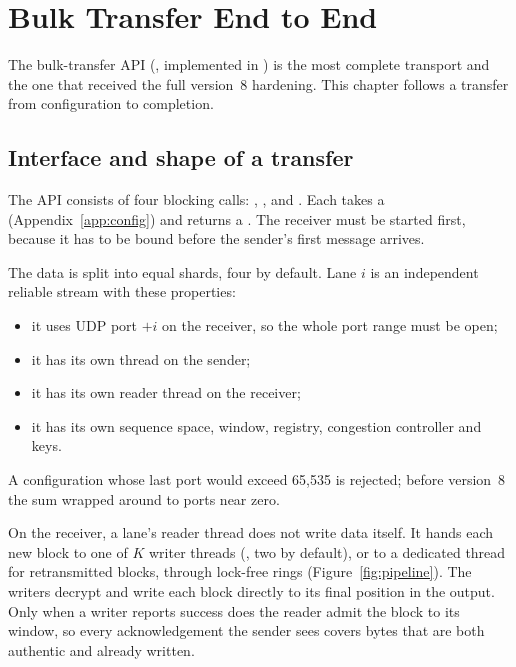 \chapter{Bulk Transfer End to End}\label{ch:transfer}

The bulk-transfer API (, implemented in ) is the most
complete transport and the one that received the full version~8 hardening. This chapter follows a transfer
from configuration to completion.

\section{Interface and shape of a transfer}

The API consists of four blocking calls: , ,  and
. Each takes a  (Appendix~\ref{app:config}) and returns a
. The receiver must be started first, because it has to be bound before the sender's
first message arrives.

The data is split into  equal shards, four by default. Lane $i$ is an independent reliable stream
with these properties:
\begin{itemize}
  \item it uses UDP port $+i$ on the receiver, so the whole port range must be open;
  \item it has its own thread on the sender;
  \item it has its own reader thread on the receiver;
  \item it has its own sequence space, window, registry, congestion controller and keys.
\end{itemize}
A configuration whose last port would exceed 65,535 is rejected\vviii; before version~8 the sum wrapped around
to ports near zero.

On the receiver, a lane's reader thread does not write data itself. It hands each new block to one of $K$ writer
threads (, two by default), or to a dedicated thread for retransmitted blocks, through
lock-free rings (Figure~\ref{fig:pipeline}). The writers decrypt and write each block directly to its final
position in the output. Only when a writer reports success does the reader admit the block to its window, so
every acknowledgement the sender sees covers bytes that are both authentic and already written.


